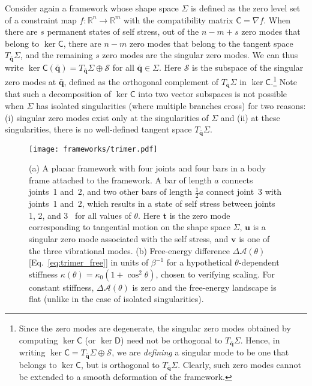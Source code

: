 Consider again a framework whose shape space $\Sigma$ is defined as the zero level set of a constraint map $f: \mathbb{R}^{n} \to \mathbb{R}^{m}$ with the compatibility matrix $\mathsf{C} = \nabla f$.
When there are $s$ permanent states of self stress, out of the $n - m + s$ zero modes that belong to $\ker\mathsf{C}$, there are $n-m$ zero modes that belong to the tangent space $T_{\bar{\bm{q}}}\Sigma$, and the remaining $s$ zero modes are the singular zero modes.
We can thus write $\ker\mathsf{C}(\bar{\bm{q}}) = T_{\bar{\bm{q}}}\Sigma \oplus \mathscr{S}$ for all $\bar{\bm{q}} \in \Sigma$.
Here $\mathscr{S}$ is the subspace of the singular zero modes at $\bar{\bm{q}}$, defined as the orthogonal complement of $T_{\bar{\bm{q}}}\Sigma$ in $\ker\mathsf{C}$.\footnote{Since the zero modes are degenerate, the singular zero modes obtained by computing $\ker\mathsf{C}$ (or $\ker\mathsf{D}$) need not be orthogonal to $T_{\bar{\bm{q}}}\Sigma$.  Hence, in writing $\ker\mathsf{C} = T_{\bar{\bm{q}}}\Sigma \oplus \mathscr{S}$, we are \emph{defining} a singular mode to be one that belongs to $\ker\mathsf{C}$, but is orthogonal to $T_{\bar{\bm{q}}}\Sigma$. Clearly, such zero modes cannot be extended to a smooth deformation of the framework.}
Note that such a decomposition of $\ker\mathsf{C}$ into two vector subspaces is not possible when $\Sigma$ has isolated singularities (where multiple branches cross) for two reasons: (i) singular zero modes exist only at the singularities of $\Sigma$ and (ii) at these singularities, there is no well-defined tangent space $T_{\bar{\bm{q}}}\Sigma$.
%
\begin{figure}
  \begin{center}
    \texttt{[image: frameworks/trimer.pdf]}
  \end{center}
  \caption{(a) A planar framework with four joints and four bars in a body frame attached to the framework.  A bar of length $a$ connects joints~1 and~2, and two other bars of length $\tfrac{1}{2}a$ connect joint~3 with joints~1 and~2, which results in a state of self stress between joints 1, 2, and 3~\cite{calladine1978} for all values of $\theta$. Here $\bm{t}$ is the zero mode corresponding to tangential motion on the shape space $\Sigma$, $\bm{u}$ is a singular zero mode associated with the self stress, and $\bm{v}$ is one of the three vibrational modes.  (b) Free-energy difference $\Delta\mathscr{A}(\theta)$ [Eq.~\eqref{eq:trimer_free}] in units of $\beta^{-1}$ for a hypothetical $\theta$-dependent stiffness $\kappa(\theta) = \kappa_{0}(1 + \cos^{2}{\theta})$, chosen to verifying scaling. For constant stiffness, $\Delta\mathscr{A}(\theta)$ is zero and the free-energy landscape is flat (unlike in the case of isolated singularities).}
  \label{fig:trimer}
\end{figure}

